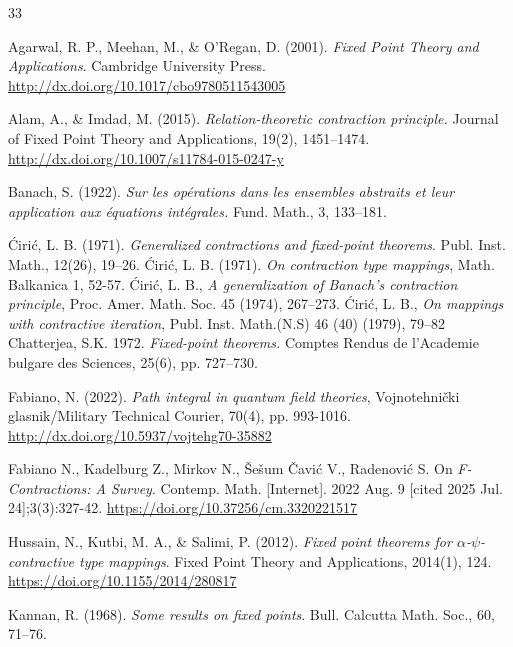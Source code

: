 \documentclass[11pt]{article}
\begin{document}
%
\begin{thebibliography}{33}



Agarwal, R. P., Meehan, M., \& O'Regan, D. (2001). \emph{Fixed Point Theory and Applications}. Cambridge University Press.
\url{http://dx.doi.org/10.1017/cbo9780511543005}

Alam, A., \& Imdad, M. (2015). \emph{Relation-theoretic contraction principle.} Journal of Fixed Point Theory and Applications, 19(2), 1451–1474.
\url{http://dx.doi.org/10.1007/s11784-015-0247-y}

 Banach, S. (1922). \emph{Sur les opérations dans les ensembles abstraits et leur application aux équations intégrales.} Fund. Math., 3, 133–181.


 \'Ciri\'c, L. B. (1971). \emph{Generalized contractions and fixed-point theorems}. Publ. Inst. Math., 12(26), 19–26.
 \'Ciri\'c, L. B. (1971). \emph{On contraction type mappings}, Math. Balkanica 1, 52-57.
  \'Ciri\'c, L. B., \emph{A generalization of Banach’s contraction principle}, Proc. Amer. Math. Soc. 45 (1974), 267–273.
 \'Ciri\'c, L. B., \emph{On mappings with contractive iteration},  Publ. Inst. Math.(N.S) 46 (40) (1979), 79–82
 Chatterjea, S.K. 1972. \emph{Fixed-point theorems.} 
Comptes Rendus de l’Academie bulgare des Sciences, 25(6), pp. 727–730.

 Fabiano, N. (2022). \emph{Path integral in quantum field theories}, Vojnotehni\v{c}ki glasnik/Military Technical Courier, 70(4),  pp. 993-1016. 
 \url{http://dx.doi.org/10.5937/vojtehg70-35882}
 

Fabiano N., Kadelburg Z., Mirkov N., \v{S}e\v{s}um \v{C}avi\'c V., Radenovi\'c S. On \emph{F-Contractions: A Survey}. Contemp. Math. [Internet]. 2022 Aug. 9 [cited 2025 Jul. 24];3(3):327-42. 
\url{https://doi.org/10.37256/cm.3320221517}

Hussain, N., Kutbi, M. A., \& Salimi, P. (2012). \emph{Fixed point theorems for 
$\alpha$-$\psi$-contractive type mappings}. Fixed Point Theory and Applications, 2014(1), 124.
\url{https://doi.org/10.1155/2014/280817}

 Kannan, R. (1968). \emph{Some results on fixed points}. Bull. Calcutta Math. Soc., 60, 71–76.



\end{thebibliography}
\end{document}

